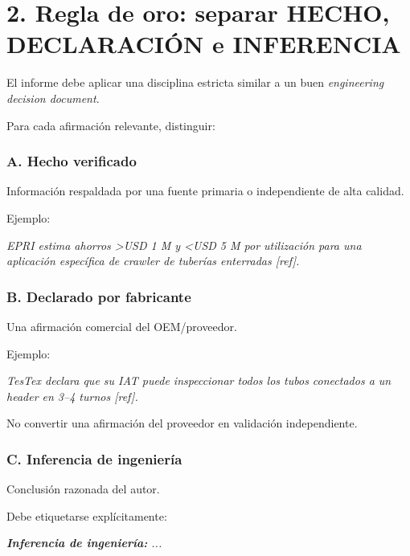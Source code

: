 \documentclass[11pt,a4paper]{article}
\newenvironment{callout}
  {\par\medskip\noindent
   \begin{lrbox}{\calloutbox}%
   \begin{minipage}{\dimexpr\linewidth-2.2em\relax}\itshape}
  {\end{minipage}\end{lrbox}%
   \noindent{\color{accent}\vrule width 2.5pt}\hspace{0.6em}%
   \colorbox{calloutbg}{\usebox{\calloutbox}}\par\medskip}
\begin{document}
\section*{2. Regla de oro: separar HECHO, DECLARACIÓN e INFERENCIA}
El informe debe aplicar una disciplina estricta similar a un buen \emph{engineering decision document}.

Para cada afirmación relevante, distinguir:


\subsubsection*{A. Hecho verificado}
Información respaldada por una fuente primaria o independiente de alta calidad.

Ejemplo:

\begin{callout}
EPRI estima ahorros \textgreater{}USD 1 M y \textless{}USD 5 M por utilización para una aplicación específica de crawler de tuberías enterradas [ref].
\end{callout}


\subsubsection*{B. Declarado por fabricante}
Una afirmación comercial del OEM/proveedor.

Ejemplo:

\begin{callout}
TesTex declara que su IAT puede inspeccionar todos los tubos conectados a un header en 3–4 turnos [ref].
\end{callout}

No convertir una afirmación del proveedor en validación independiente.


\subsubsection*{C. Inferencia de ingeniería}
Conclusión razonada del autor.

Debe etiquetarse explícitamente:

\begin{callout}
\textbf{Inferencia de ingeniería:} ...
\end{callout}
\end{document}

